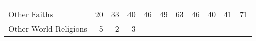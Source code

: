 \documentclass[]{article}
\begin{document}
\begin{longtable}[]{@{}lrrrrrrrrrr@{}}
\begin{minipage}[t]{0.11\columnwidth}
\end{minipage}\tabularnewline
\begin{minipage}[t]{0.14\columnwidth}\raggedright\strut
Other Faiths\strut
\end{minipage} & \begin{minipage}[t]{0.04\columnwidth}\raggedleft\strut
20\strut
\end{minipage} & \begin{minipage}[t]{0.05\columnwidth}\raggedleft\strut
33\strut
\end{minipage} & \begin{minipage}[t]{0.05\columnwidth}\raggedleft\strut
40\strut
\end{minipage} & \begin{minipage}[t]{0.05\columnwidth}\raggedleft\strut
46\strut
\end{minipage} & \begin{minipage}[t]{0.05\columnwidth}\raggedleft\strut
49\strut
\end{minipage} & \begin{minipage}[t]{0.05\columnwidth}\raggedleft\strut
63\strut
\end{minipage} & \begin{minipage}[t]{0.06\columnwidth}\raggedleft\strut
46\strut
\end{minipage} & \begin{minipage}[t]{0.06\columnwidth}\raggedleft\strut
40\strut
\end{minipage} & \begin{minipage}[t]{0.04\columnwidth}\raggedleft\strut
41\strut
\end{minipage} & \begin{minipage}[t]{0.11\columnwidth}\raggedleft\strut
71\strut
\end{minipage}\tabularnewline
\begin{minipage}[t]{0.14\columnwidth}\raggedright\strut
Other World Religions\strut
\end{minipage} & \begin{minipage}[t]{0.04\columnwidth}\raggedleft\strut
5\strut
\end{minipage} & \begin{minipage}[t]{0.05\columnwidth}\raggedleft\strut
2\strut
\end{minipage} & \begin{minipage}[t]{0.05\columnwidth}\raggedleft\strut
3\strut
\end{minipage} & \begin{minipage}[t]{0.05\columnwidth}\raggedleft\strut

\end{minipage}
\end{longtable}
\end{document}
